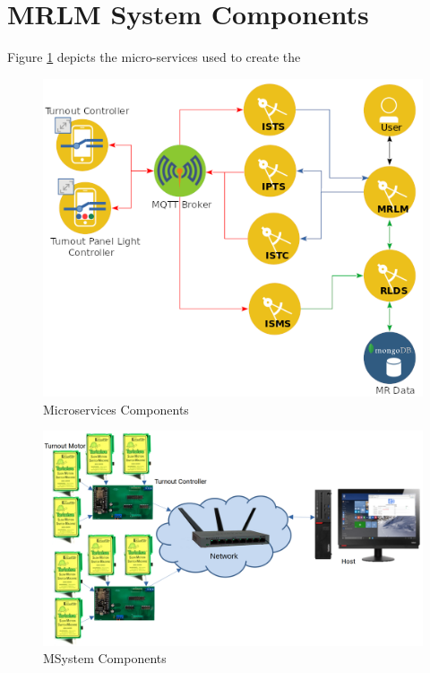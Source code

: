 \section{MRLM System Components}

Figure \ref{fig:mrlm-ms-components} depicts the micro-services used to create the

\begin{figure}[H]
	\centering
		\includegraphics[scale=0.8]{mrlm_design.png}
	\caption{Microservices Components}
	\label{fig:mrlm-ms-components}
\end{figure}


\begin{figure}[H]
	\centering
		\includegraphics[scale=0.2]{turnout_system.png}
	\caption{MSystem Components}
	\label{fig:turnout-system}
\end{figure}